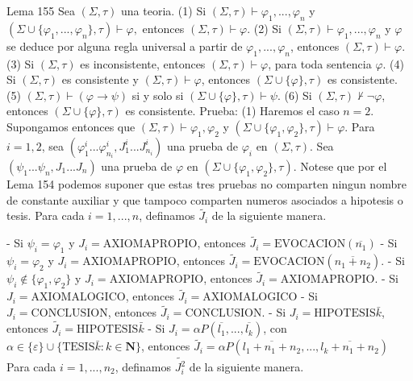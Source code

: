 Lema 155 Sea \((\Sigma ,\tau )\) una teoria.
(1) Si \((\Sigma ,\tau )\vdash \varphi _{1},...,\varphi _{n}\) y \( (\Sigma \cup \{\varphi _{1},...,\varphi _{n}\},\tau )\vdash \varphi ,\) entonces \((\Sigma ,\tau )\vdash \varphi .\)
(2) Si \((\Sigma ,\tau )\vdash \varphi _{1},...,\varphi _{n}\) y \( \varphi \) se deduce por alguna regla universal a partir de \(\varphi _{1},...,\varphi _{n}\), entonces \((\Sigma ,\tau )\vdash \varphi \).
(3) Si \((\Sigma ,\tau )\) es inconsistente, entonces \((\Sigma ,\tau )\vdash \varphi \), para toda sentencia \(\varphi .\)
(4) Si \((\Sigma ,\tau )\) es consistente y \((\Sigma ,\tau )\vdash \varphi \), entonces \((\Sigma \cup \{\varphi \},\tau )\) es consistente.
(5) \((\Sigma ,\tau )\vdash (\varphi \rightarrow \psi )\) si y solo si \( (\Sigma \cup \{\varphi \},\tau )\vdash \psi \).
(6) Si \((\Sigma ,\tau )\not\vdash \lnot \varphi \), entonces \((\Sigma \cup \{\varphi \},\tau )\) es consistente.
Prueba: (1) Haremos el caso \(n=2.\) Supongamos entonces que \((\Sigma ,\tau )\vdash \varphi _{1},\varphi _{2}\) y \((\Sigma \cup \{\varphi _{1},\varphi _{2}\},\tau )\vdash \varphi \). Para \(i=1,2\), sea \((\varphi _{1}^{i}...\varphi _{n_{i}}^{i},J_{1}^{i}...J_{n_{i}}^{i})\) una prueba de \( \varphi _{i}\) en \((\Sigma ,\tau )\). Sea \((\psi _{1}...\psi _{n},J_{1}...J_{n})\) una prueba de \(\varphi \) en \((\Sigma \cup \{\varphi _{1},\varphi _{2}\},\tau )\). Notese que por el Lema 154 podemos suponer que estas tres pruebas no comparten ningun nombre de constante auxiliar y que tampoco comparten numeros asociados a hipotesis o tesis. Para cada \(i=1,...,n\), definamos \(\widetilde{J_{i}}\) de la siguiente manera.

- Si \(\psi _{i}=\varphi _{1}\) y \(J_{i}=\mathrm{AXIOMAPROPIO}\), entonces \(\widetilde{J_{i}}=\mathrm{EVOCACION}(\overline{n_{1}})\)
- Si \(\psi _{i}=\varphi _{2}\) y \(J_{i}=\mathrm{AXIOMAPROPIO}\), entonces \(\widetilde{J_{i}}=\mathrm{EVOCACION}(\overline{n_{1}+n_{2}})\).
- Si \(\psi _{i}\notin \{\varphi _{1},\varphi _{2}\}\) y \(J_{i}=\mathrm{ AXIOMAPROPIO}\), entonces \(\widetilde{J_{i}}=\mathrm{AXIOMAPROPIO}\).
- Si \(J_{i}=\mathrm{AXIOMALOGICO}\), entonces \(\widetilde{J_{i}}= \mathrm{AXIOMALOGICO}\)
- Si \(J_{i}=\mathrm{CONCLUSION}\), entonces \(\widetilde{J_{i}}=\mathrm{ CONCLUSION}\).
- Si \(J_{i}=\mathrm{HIPOTESIS}\bar{k}\), entonces \(\widetilde{J_{i}}= \mathrm{HIPOTESIS}\bar{k}\)
- Si \(J_{i}=\alpha P(\overline{l_{1}},...,\overline{l_{k}})\), con \( \alpha \in \{\varepsilon \}\cup \{\mathrm{TESIS}\bar{k}:k\in \mathbf{N}\}\), entonces \(\widetilde{J_{i}}=\alpha P(\overline{l_{1}+n_{1}+n_{2}},..., \overline{l_{k}+n_{1}+n_{2}})\)
Para cada \(i=1,...,n_{2}\), definamos \(\widetilde{J_{i}^{2}}\) de la siguiente manera.

